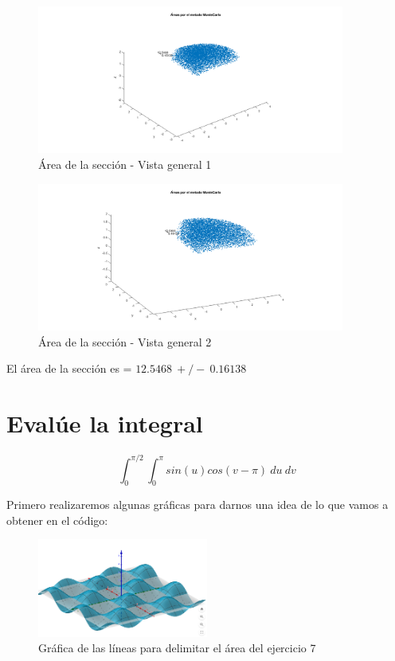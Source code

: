\documentclass{article}
\begin{document}
\begin{figure}[H]
\centering
    \includegraphics[width=0.9\textwidth]{images/FIG06A.png}
    \caption{Área de la sección - Vista general 1}
\end{figure}
\begin{figure}[H]
\centering
    \includegraphics[width=0.9\textwidth]{images/FIG06B.png}
    \caption{Área de la sección - Vista general 2}
\end{figure}

El área de la sección es = $12.5468~+/-~0.16138$

\clearpage
\newpage

\section{Evalúe la integral}

\begin{equation}
\int_{0}^{\pi/2}\int_{0}^{\pi} sin(u)cos(v-\pi)~du~dv
\end{equation}

Primero realizaremos algunas gráficas para darnos una idea de lo que vamos a obtener en el código:

\begin{figure}[H]
\centering
    \includegraphics[width=0.5\textwidth]{images/Capture07.PNG}
    \caption{Gráfica de las líneas para delimitar el área del ejercicio 7}
\end{figure}
\end{document}
